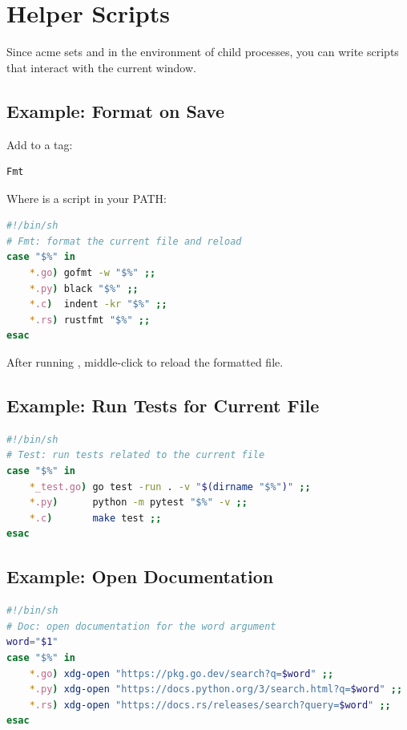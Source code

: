 \section{Helper Scripts}
\label{sec:helpers}


Since acme sets  and \env{\%} in the environment of child
processes, you can write scripts that interact with the current window.

\subsection{Example: Format on Save}

Add to a tag:

\begin{Verbatim}[frame=single]
Fmt
\end{Verbatim}

\noindent
Where  is a script in your PATH:

\begin{lstlisting}[language=bash]
#!/bin/sh
# Fmt: format the current file and reload
case "$%" in
    *.go) gofmt -w "$%" ;;
    *.py) black "$%" ;;
    *.c)  indent -kr "$%" ;;
    *.rs) rustfmt "$%" ;;
esac
\end{lstlisting}

After running , middle-click  to reload the
formatted file.

\subsection{Example: Run Tests for Current File}

\begin{lstlisting}[language=bash]
#!/bin/sh
# Test: run tests related to the current file
case "$%" in
    *_test.go) go test -run . -v "$(dirname "$%")" ;;
    *.py)      python -m pytest "$%" -v ;;
    *.c)       make test ;;
esac
\end{lstlisting}

\subsection{Example: Open Documentation}

\begin{lstlisting}[language=bash]
#!/bin/sh
# Doc: open documentation for the word argument
word="$1"
case "$%" in
    *.go) xdg-open "https://pkg.go.dev/search?q=$word" ;;
    *.py) xdg-open "https://docs.python.org/3/search.html?q=$word" ;;
    *.rs) xdg-open "https://docs.rs/releases/search?query=$word" ;;
esac
\end{lstlisting}

